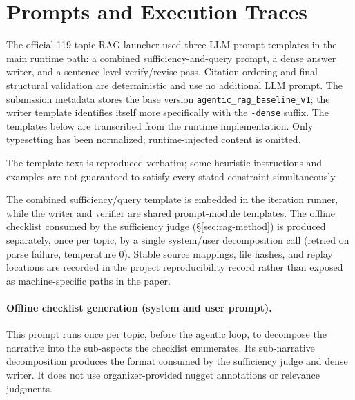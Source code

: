 \section{Prompts and Execution Traces}
\label{app:prompts-traces}

The official 119-topic RAG launcher used three LLM prompt templates in
the main runtime path: a combined sufficiency-and-query prompt, a dense
answer writer, and a sentence-level verify/revise pass. Citation
ordering and final structural validation are deterministic and use no
additional LLM prompt. The submission metadata
stores the base version \texttt{agentic\_rag\_baseline\_v1}; the writer
template identifies itself more specifically with the \texttt{-dense}
suffix. The templates below are transcribed from the runtime
implementation. Only typesetting has been normalized; runtime-injected
content is omitted.

The template text is reproduced verbatim; some heuristic instructions
and examples are not guaranteed to satisfy every stated constraint
simultaneously.

The combined sufficiency/query template is embedded in
the iteration runner, while the writer and verifier are shared
prompt-module templates. The offline checklist consumed by the sufficiency judge
(\S\ref{sec:rag-method}) is produced separately, once per topic, by a
single system/user decomposition call (retried on parse failure,
temperature 0). Stable source mappings, file hashes, and replay locations
are recorded in the project reproducibility record rather than exposed
as machine-specific paths in the paper.

\paragraph{Offline checklist generation (system and user prompt).} This
prompt runs once per topic, before the agentic loop, to decompose the
narrative into the sub-aspects the checklist enumerates. Its
sub-narrative decomposition produces the format consumed by the
sufficiency judge and dense writer. It does not use
organizer-provided nugget annotations or relevance judgments.


